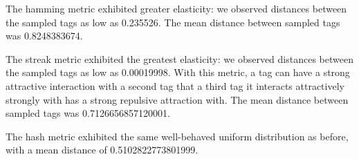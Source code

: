 The hamming metric exhibited greater elasticity: we observed distances between the sampled tags as low as 0.235526.
The mean distance between sampled tags was 0.8248383674.

The streak metric exhibited the greatest elasticity: we observed distances between the sampled tags as low as 0.00019998.
With this metric, a tag can have a strong attractive interaction with a second tag that a third tag it interacts attractively strongly with has a strong repulsive attraction with.
The mean distance between sampled tags was 0.7126656857120001.

The hash metric exhibited the same well-behaved uniform distribution as before, with a mean distance of 0.5102822773801999.

